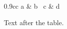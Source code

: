 \documentclass{article}
\begin{document}
\begin{table}[htbp]
\begin{tabular*}{0.9\textwidth}{cc} a & b \ c & d \end{tabular*}
\caption{A caption.}
\end{table}
Text after the table.
\end{document}

